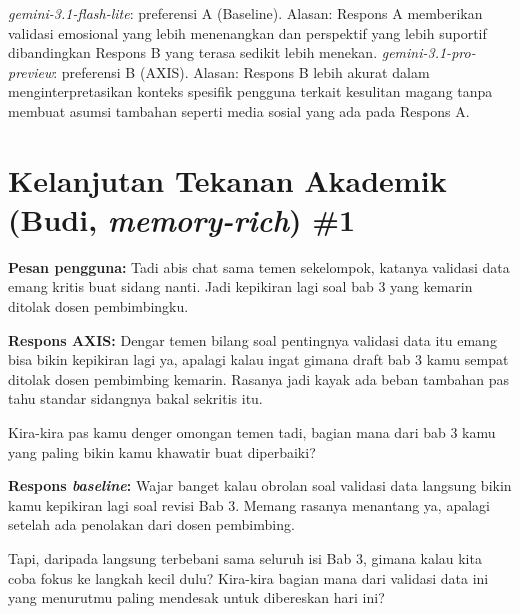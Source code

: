 \textit{gemini-3.1-flash-lite}: preferensi A (Baseline). Alasan: Respons A memberikan validasi emosional yang lebih menenangkan dan perspektif yang lebih suportif dibandingkan Respons B yang terasa sedikit lebih menekan.\newline
\textit{gemini-3.1-pro-preview}: preferensi B (AXIS). Alasan: Respons B lebih akurat dalam menginterpretasikan konteks spesifik pengguna terkait kesulitan magang tanpa membuat asumsi tambahan seperti media sosial yang ada pada Respons A.\newline

\section{Kelanjutan Tekanan Akademik (Budi, \textit{memory-rich}) \#1}

\textbf{Pesan pengguna:} Tadi abis chat sama temen sekelompok, katanya validasi data emang kritis buat sidang nanti. Jadi kepikiran lagi soal bab 3 yang kemarin ditolak dosen pembimbingku.

\textbf{Respons AXIS:} Dengar temen bilang soal pentingnya validasi data itu emang bisa bikin kepikiran lagi ya, apalagi kalau ingat gimana draft bab 3 kamu sempat ditolak dosen pembimbing kemarin. Rasanya jadi kayak ada beban tambahan pas tahu standar sidangnya bakal sekritis itu.

Kira-kira pas kamu denger omongan temen tadi, bagian mana dari bab 3 kamu yang paling bikin kamu khawatir buat diperbaiki?

\textbf{Respons \textit{baseline}:} Wajar banget kalau obrolan soal validasi data langsung bikin kamu kepikiran lagi soal revisi Bab 3. Memang rasanya menantang ya, apalagi setelah ada penolakan dari dosen pembimbing.

Tapi, daripada langsung terbebani sama seluruh isi Bab 3, gimana kalau kita coba fokus ke langkah kecil dulu? Kira-kira bagian mana dari validasi data ini yang menurutmu paling mendesak untuk dibereskan hari ini?

